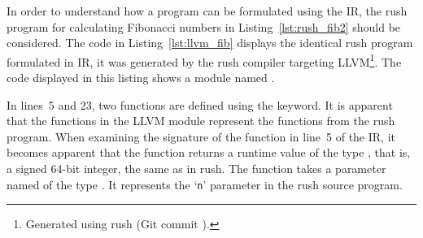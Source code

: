 
In order to understand how a program can be formulated using the IR, the rush program for calculating Fibonacci numbers in Listing~\ref{lst:rush_fib2} should be considered.
The code in Listing~\ref{lst:llvm_fib} displays the identical rush program formulated in IR,
it was generated by the rush compiler targeting LLVM\footnote{Generated using rush (Git commit \rushCommit{}).}.
The code displayed in this listing shows a module named .


In lines~5 and 23, two functions are defined using the  keyword.
It is apparent that the functions in the LLVM module represent the functions from the rush program.
When examining the signature of the  function in line~5 of the IR,
it becomes apparent that the function returns a runtime value of the type , that is, a signed 64-bit integer, the same as  in rush.
The function takes a parameter named  of the type .
It represents the `\texttt{n}' parameter in the rush source program.

